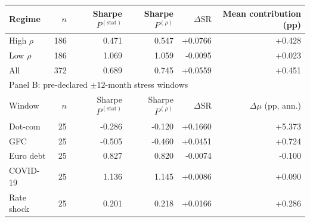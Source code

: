 \begin{tabular}{lrrrrr}
\toprule
Regime & $n$ & Sharpe $P^{(\mathrm{stat})}$ & Sharpe $P^{(\rho)}$ & $\Delta\mathrm{SR}$ & Mean contribution (pp) \\
\midrule
High $\rho$ & 186 & 0.471 & 0.547 & +0.0766 & +0.428 \\
Low $\rho$ & 186 & 1.069 & 1.059 & -0.0095 & +0.023 \\
All & 372 & 0.689 & 0.745 & +0.0559 & +0.451 \\
\midrule
\multicolumn{6}{l}{Panel B: pre-declared $\pm12$-month stress windows} \\
Window & $n$ & Sharpe $P^{(\mathrm{stat})}$ & Sharpe $P^{(\rho)}$ & $\Delta\mathrm{SR}$ & $\Delta\mu$ (pp, ann.) \\
\midrule
Dot-com & 25 & -0.286 & -0.120 & +0.1660 & +5.373 \\
GFC & 25 & -0.505 & -0.460 & +0.0451 & +0.724 \\
Euro debt & 25 & 0.827 & 0.820 & -0.0074 & -0.100 \\
COVID-19 & 25 & 1.136 & 1.145 & +0.0086 & +0.090 \\
Rate shock & 25 & 0.201 & 0.218 & +0.0166 & +0.286 \\
\bottomrule
\end{tabular}
